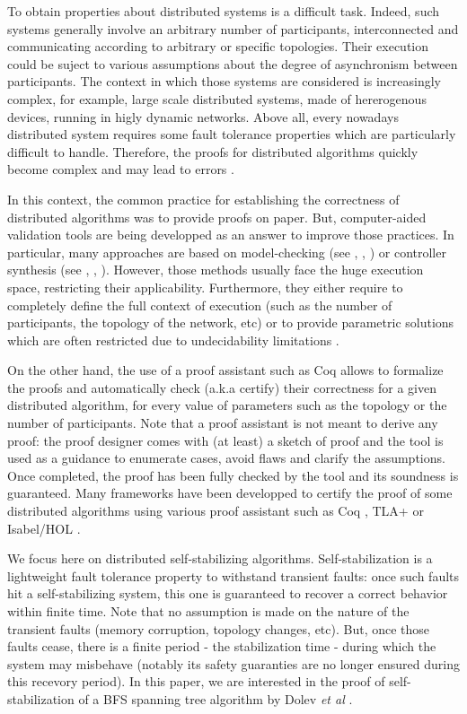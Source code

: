To obtain properties about distributed systems is a difficult task.
Indeed, such systems generally involve an arbitrary number of
participants, interconnected and communicating according to arbitrary
or specific topologies.  Their execution could be suject to various
assumptions about the degree of asynchronism between participants.
The context in which those systems are considered is increasingly
complex, for example, large scale distributed systems, made of
hererogenous devices, running in higly dynamic networks. Above all,
every nowadays distributed system requires some fault tolerance
properties which are particularly difficult to handle.  Therefore, the
proofs for distributed algorithms quickly become complex and may lead
to errors \cite{Lamport2012}.

In this context, the common practice for establishing the correctness
of distributed algorithms was to provide proofs on paper. But,
computer-aided validation tools are being developped as an answer to
improve those practices.  In particular, many approaches are based on
model-checking (see \eg, \cite{DBLP:journals/sttt/BertrandKLW21},
\cite{Tsuchiya01}) or controller synthesis (see \eg,
\cite{Ebnenasir22}, \cite{DBLP:journals/dc/VolkBKA22}).  However,
those methods usually face the huge execution space, restricting
their applicability. Furthermore, they either require to completely
define the full context of execution (such as the number of
participants, the topology of the network, etc) or to provide
parametric solutions which are often restricted due to undecidability
limitations \cite{DBLP:series/synthesis/2015Bloem}.

On the other hand, the use of a proof assistant such as Coq \cite{coq}
allows to formalize the proofs and automatically check (a.k.a certify)
their correctness for a given distributed algorithm, for every value
of parameters such as the topology or the number of participants.
Note that a proof assistant is not meant to derive any proof: the
proof designer comes with (at least) a sketch of proof and the tool is
used as a guidance to enumerate cases, avoid flaws and clarify the
assumptions. Once completed, the proof has been fully checked by the
tool and its soundness is guaranteed. Many frameworks have been
developped to certify the proof of some distributed algorithms using
various proof assistant such as Coq \cite{ACD7,Courtieu02,pactole},
TLA+ \cite{CDLMRV12c,tla} or Isabel/HOL \cite{berni,JM05tr,KNR12}.

We focus here on distributed self-stabilizing
algorithms. Self-stabilization \cite{D74j} is a lightweight fault
tolerance property to withstand transient faults: once such faults hit
a self-stabilizing system, this one is guaranteed to recover a correct
behavior within finite time. Note that no assumption is made on the
nature of the transient faults (memory corruption, topology changes,
etc). But, once those faults cease, there is a finite period - the
stabilization time - during which the system may misbehave (notably
its safety guaranties are no longer ensured during this recevory
period).  In this paper, we are interested in the proof of
self-stabilization of a BFS spanning tree algorithm by Dolev \emph{et
al} \cite{DIM93}.

